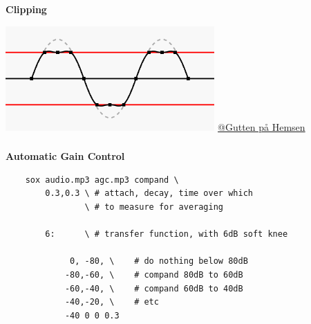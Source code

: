 \documentclass[usenames,dvipsnames, 18pt, compress, aspectratio=169]{beamer}
\begin{document}
\begin{frame}[fragile]{}
    \frametitle{}
    \begin{center}
        \textbf{Clipping}
        \vspace{0.2cm}

        \includegraphics[width=0.6\textwidth]{clipping.png}
        \hspace*{-2cm}
        \href{https://en.wikipedia.org/wiki/File:Clipping.svg}
             {\color{black}\fontsize{5pt}{0}\selectfont @Gutten på Hemsen}


    \end{center}
\end{frame}

\begin{frame}[fragile]{}
    \frametitle{}
    \begin{center}
        \textbf{Automatic Gain Control}
        \vspace{0.2cm}


        \begin{verbatim}
    sox audio.mp3 agc.mp3 compand \
        0.3,0.3 \ # attach, decay, time over which
                \ # to measure for averaging

        6:      \ # transfer function, with 6dB soft knee

             0, -80, \    # do nothing below 80dB
            -80,-60, \    # compand 80dB to 60dB
            -60,-40, \    # compand 60dB to 40dB
            -40,-20, \    # etc
            -40 0 0 0.3
        \end{verbatim}
    \end{center}
\end{frame}
\end{document}

